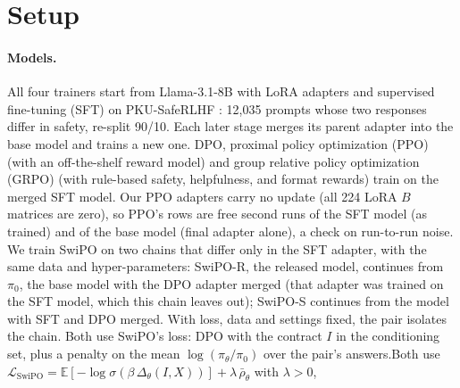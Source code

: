 \section{Setup}

\paragraph{Models.} All four trainers start from Llama-3.1-8B \cite{dubey2024llama} with LoRA adapters \cite{hu2022lora} and supervised fine-tuning (SFT) on \mbox{PKU-SafeRLHF} \cite{ji2024pku}: 12,035 prompts whose two responses differ in safety, re-split 90/10. Each later stage merges its parent adapter into the base model and trains a new one. DPO, proximal policy optimization (PPO) \cite{schulman2017proximal} (with an off-the-shelf reward model) and group relative policy optimization (GRPO) \cite{shao2024deepseekmath} (with rule-based safety, helpfulness, and format rewards) train on the merged SFT model. Our PPO adapters carry no update (all 224 LoRA $B$ matrices are zero), so PPO's rows are free second runs of the SFT model (as trained) and of the base model (final adapter alone), a check on run-to-run noise. We train SwiPO on two chains that differ only in the SFT adapter, with the same data and hyper-parameters: \mbox{SwiPO-R}\ifanon\else, the released model,\fi{} continues from $\pi_0$, the base model with the DPO adapter merged (that adapter was trained on the SFT model, which this chain leaves out); \mbox{SwiPO-S} continues from the model with SFT and DPO merged. With loss, data and settings fixed, the pair isolates the chain. \ifvenueLoyal Both use SwiPO's loss: DPO with the contract $I$ in the conditioning set, plus a penalty on the mean $\log(\pi_\theta/\pi_0)$ over the pair's answers.\else Both use
$\mathcal{L}_{\mathrm{SwiPO}} = \mathbb{E}[-\log\sigma(\beta\,\Delta_\theta(I,X))] + \lambda\,\bar{\rho}_\theta$ with $\lambda>0$,
